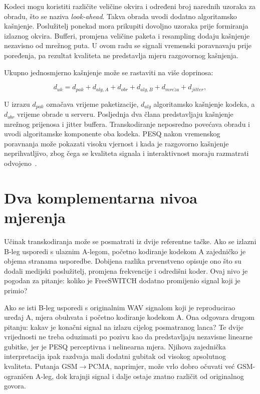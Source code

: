 Kodeci mogu koristiti različite veličine okvira i određeni broj narednih uzoraka za obradu, što se naziva \emph{look-ahead}. Takva obrada uvodi dodatno algoritamsko kašnjenje. Poslužitelj ponekad mora prikupiti dovoljno uzoraka prije formiranja izlaznog okvira. Bufferi, promjena veličine paketa i resampling dodaju kašnjenje nezavisno od mrežnog puta. U ovom radu se signali vremenski poravnavaju prije poređenja, pa rezultat kvaliteta ne predstavlja mjeru razgovornog kašnjenja.

Ukupno jednosmjerno kašnjenje može se rastaviti na više doprinosa:

\begin{equation}
d_{uk}=d_{pak}+d_{alg,A}+d_{obr}+d_{alg,B}+d_{mre\check{z}a}+d_{jitter},
\end{equation}

U izrazu $d_{pak}$ označava vrijeme paketizacije, $d_{alg}$ algoritamsko kašnjenje kodeka, a $d_{obr}$ vrijeme obrade u serveru. Posljednja dva člana predstavljaju kašnjenje mrežnog prijenosa i jitter buffera. Transkodiranje neposredno povećava obradu i uvodi algoritamske komponente oba kodeka. PESQ nakon vremenskog poravnanja može pokazati visoku vjernost i kada je razgovorno kašnjenje neprihvatljivo, zbog čega se kvaliteta signala i interaktivnost moraju razmatrati odvojeno~\cite{itu-g114}.

\section{Dva komplementarna nivoa mjerenja}

Učinak transkodiranja može se posmatrati iz dvije referentne tačke. Ako se izlazni B-leg usporedi s ulaznim A-legom, početno kodiranje kodekom A zajedničko je objema stranama usporedbe. Dobijena razlika prvenstveno opisuje ono što su dodali medijski poslužitelj, promjena frekvencije i odredišni koder. Ovaj nivo je pogodan za pitanje: koliko je FreeSWITCH dodatno promijenio signal koji je primio?

Ako se isti B-leg usporedi s originalnim WAV signalom koji je reproducirao uređaj A, mjera obuhvata i početno kodiranje kodekom A. Ona odgovara drugom pitanju: kakav je konačni signal na izlazu cijelog posmatranog lanca? Te dvije vrijednosti ne treba oduzimati po pozivu kao da predstavljaju nezavisne linearne gubitke, jer je PESQ perceptivna i nelinearna mjera. Njihova zajednička interpretacija ipak razdvaja mali dodatni gubitak od visokog apsolutnog kvaliteta. Putanja GSM$\rightarrow$PCMA, naprimjer, može vrlo dobro očuvati već GSM-ograničen A-leg, dok krajnji signal i dalje ostaje znatno različit od originalnog govora.


